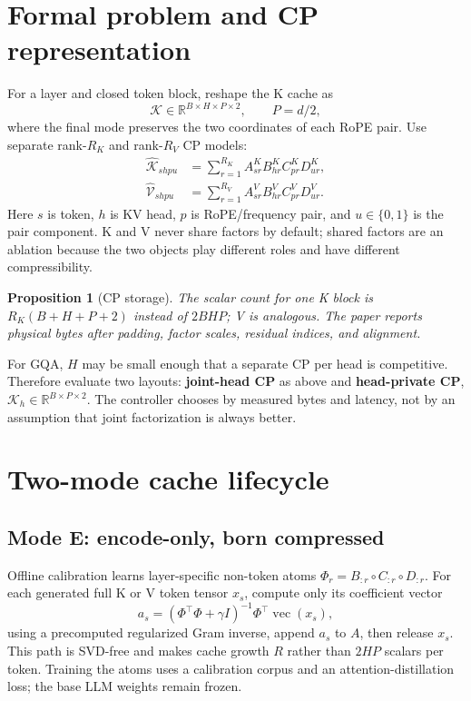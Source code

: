 \documentclass[11pt]{article}
\newtheorem{proposition}{Proposition}
\newcommand{\R}{\mathbb{R}}
\newcommand{\term}[1]{\textbf{\color{accent!85!black}#1}}
\begin{document}
\section{Formal problem and CP representation}
\label{sec:cp}

For a layer and closed token block, reshape the K cache as
\[
\mathcal K\in\R^{B\times H\times P\times 2}, \qquad P=d/2,
\]
where the final mode preserves the two coordinates of each RoPE pair. Use separate rank-$R_K$ and
rank-$R_V$ CP models:
\begin{align}
\widehat{\mathcal K}_{shpu}
&=\sum_{r=1}^{R_K}A^K_{sr}B^K_{hr}C^K_{pr}D^K_{ur}, \label{eq:cpk}\\
\widehat{\mathcal V}_{shpu}
&=\sum_{r=1}^{R_V}A^V_{sr}B^V_{hr}C^V_{pr}D^V_{ur}. \label{eq:cpv}
\end{align}
Here $s$ is token, $h$ is KV head, $p$ is RoPE/frequency pair, and $u\in\{0,1\}$ is the pair
component. K and V never share factors by default; shared factors are an ablation because the two
objects play different roles and have different compressibility.

\begin{proposition}[CP storage]
The scalar count for one K block is
$R_K(B+H+P+2)$ instead of $2BHP$; V is analogous. The paper reports physical bytes after padding,
factor scales, residual indices, and alignment.
\end{proposition}

For GQA, $H$ may be small enough that a separate CP per head is competitive. Therefore evaluate two
layouts: \term{joint-head CP} as above and \term{head-private CP},
$\mathcal K_h\in\R^{B\times P\times2}$. The controller chooses by measured bytes and latency, not
by an assumption that joint factorization is always better.

\section{Two-mode cache lifecycle}
\label{sec:lifecycle}

\subsection{Mode E: encode-only, born compressed}

Offline calibration learns layer-specific non-token atoms
$\Phi_r=B_{:r}\circ C_{:r}\circ D_{:r}$. For each generated full K or V token tensor $x_s$, compute
only its coefficient vector
\[
a_s=(\Phi^\top\Phi+\gamma I)^{-1}\Phi^\top\operatorname{vec}(x_s),
\]
using a precomputed regularized Gram inverse, append $a_s$ to $A$, then release $x_s$. This path is
SVD-free and makes cache growth $R$ rather than $2HP$ scalars per token. Training the atoms uses a
calibration corpus and an attention-distillation loss; the base LLM weights remain frozen.
\end{document}
